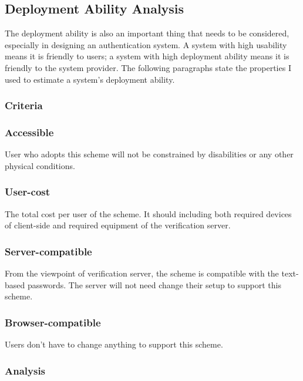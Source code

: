\begin{CJK}{Bg5}{bsmi}
\section{Deployment Ability Analysis}

The deployment ability is also an important thing that needs to be considered, especially in designing an authentication system. A system with high usability means it is friendly to users; a system with high deployment ability means it is friendly to the system provider. The following paragraphs state the properties I used to estimate a system's deployment ability.

\subsubsection{Criteria}

\subsubsection{Accessible}

User who adopts this scheme will not be constrained by disabilities or any other physical conditions.

\subsubsection{User-cost}

The total cost per user of the scheme. It should including both required devices of client-side and required equipment of the verification server.

\subsubsection{Server-compatible}

From the viewpoint of verification server, the scheme is compatible with the text-based passwords. The server will not need change their setup to support this scheme. 

\subsubsection{Browser-compatible}

Users don't have to change anything to support this scheme. 

\subsubsection{Analysis}


\end{CJK}
